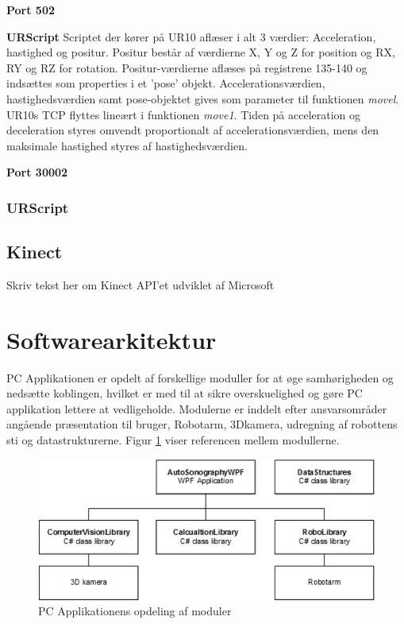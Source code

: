 \textbf{Port 502}

\textbf{URScript}
Scriptet der kører på UR10 aflæser i alt 3 værdier:
Acceleration, hastighed og positur.
Positur består af værdierne X, Y og Z for position og RX, RY og RZ for rotation.
Positur-værdierne aflæses på registrene 135-140 og indsættes som properties i et 'pose' objekt.
Accelerationsværdien, hastighedsværdien samt pose-objektet gives som parameter til funktionen \textit{movel}.
UR10s TCP flyttes lineært i funktionen \textit{move1}. Tiden på acceleration og deceleration styres omvendt proportionalt af accelerationsværdien, mens den maksimale hastighed styres af hastighedsværdien.

\textbf{Port 30002}
\subsubsection{URScript}

\subsection{Kinect}
Skriv tekst her om Kinect API'et udviklet af Microsoft

\section{Softwarearkitektur}
PC Applikationen er opdelt af forskellige moduller for at øge samhørigheden og nedsætte koblingen, hvilket er med til at sikre overskuelighed og gøre PC applikation lettere at vedligeholde. Modulerne er inddelt efter ansvarsområder angående præsentation til bruger, Robotarm, 3Dkamera, udregning af robottens sti og datastrukturerne. Figur \ref{Layers} viser referencen mellem modullerne. 

\begin{figure}[H]
    \centering
    \includegraphics[width=1\textwidth]{figurer/d/Design/Layers}
    \caption{PC Applikationens opdeling af moduler }
    \label{Layers}
\end{figure}


